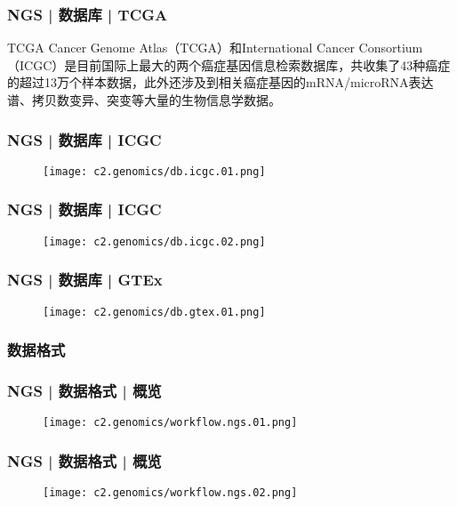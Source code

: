 \begin{frame}
  \frametitle{NGS | 数据库 | TCGA}
  \begin{block}{TCGA}
Cancer Genome Atlas（TCGA）和International Cancer Consortium（ICGC）是目前国际上最大的两个癌症基因信息检索数据库，共收集了43种癌症的超过13万个样本数据，此外还涉及到相关癌症基因的mRNA/microRNA表达谱、拷贝数变异、突变等大量的生物信息学数据。
  \end{block}
\end{frame}

\begin{frame}
  \frametitle{NGS | 数据库 | ICGC}
  \begin{figure}
    \centering
    \texttt{[image: c2.genomics/db.icgc.01.png]}
  \end{figure}
\end{frame}

\begin{frame}
  \frametitle{NGS | 数据库 | ICGC}
  \begin{figure}
    \centering
    \texttt{[image: c2.genomics/db.icgc.02.png]}
  \end{figure}
\end{frame}

\begin{frame}
  \frametitle{NGS | 数据库 | GTEx}
  \begin{figure}
    \centering
    \texttt{[image: c2.genomics/db.gtex.01.png]}
  \end{figure}
\end{frame}

\subsubsection{数据格式}
\begin{frame}
  \frametitle{NGS | 数据格式 | 概览}
  \begin{figure}
    \centering
    \texttt{[image: c2.genomics/workflow.ngs.01.png]}
  \end{figure}
\end{frame}

\begin{frame}
  \frametitle{NGS | 数据格式 | 概览}
  \begin{figure}
    \centering
    \texttt{[image: c2.genomics/workflow.ngs.02.png]}
  \end{figure}
\end{frame}

